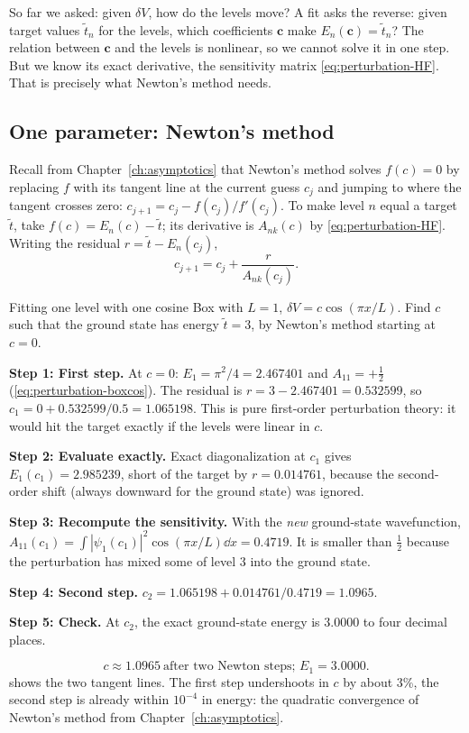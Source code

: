 So far we asked: given $\delta V$, how do the levels move? A fit asks the reverse: given target values $\tilde t_n$ for the levels, which coefficients $\bm c$ make $E_n(\bm c)=\tilde t_n$? The relation between $\bm c$ and the levels is nonlinear, so we cannot solve it in one step. But we know its exact derivative, the sensitivity matrix \cref{eq:perturbation-HF}. That is precisely what Newton's method needs.

\subsection{One parameter: Newton's method}

Recall from Chapter~\ref{ch:asymptotics} that Newton's method solves $f(c)=0$ by replacing $f$ with its tangent line at the current guess $c_j$ and jumping to where the tangent crosses zero: $c_{j+1}=c_j-f(c_j)/f'(c_j)$. To make level $n$ equal a target $\tilde t$, take $f(c)=E_n(c)-\tilde t$; its derivative is $A_{nk}(c)$ by \cref{eq:perturbation-HF}. Writing the residual $r=\tilde t-E_n(c_j)$,
\begin{equation}
c_{j+1}=c_j+\frac{r}{A_{nk}(c_j)} .
\label{eq:perturbation-newton1}
\end{equation}

\begin{sample}{Fitting one level with one cosine}
Box with $L=1$, $\delta V=c\cos(\pi x/L)$. Find $c$ such that the ground state has energy $\tilde t=3$, by Newton's method starting at $c=0$.

\textbf{Step 1: First step.} At $c=0$: $E_1=\pi^2/4=2.467401$ and $A_{11}=+\tfrac12$ (\cref{eq:perturbation-boxcos}). The residual is $r=3-2.467401=0.532599$, so $c_1=0+0.532599/0.5=1.065198$. This is pure first-order perturbation theory: it would hit the target exactly if the levels were linear in $c$.

\textbf{Step 2: Evaluate exactly.} Exact diagonalization at $c_1$ gives $E_1(c_1)=2.985239$, short of the target by $r=0.014761$, because the second-order shift (always downward for the ground state) was ignored.

\textbf{Step 3: Recompute the sensitivity.} With the \emph{new} ground-state wavefunction, $A_{11}(c_1)=\int|\psi_1(c_1)|^2\cos(\pi x/L)\dd x=0.4719$. It is smaller than $\tfrac12$ because the perturbation has mixed some of level 3 into the ground state.

\textbf{Step 4: Second step.} $c_2=1.065198+0.014761/0.4719=1.0965$.

\textbf{Step 5: Check.} At $c_2$, the exact ground-state energy is $3.0000$ to four decimal places.

\[
\boxed{c\approx1.0965\ \text{after two Newton steps; }E_1=3.0000.}
\]
 shows the two tangent lines. The first step undershoots in $c$ by about 3\%, the second step is already within $10^{-4}$ in energy: the quadratic convergence of Newton's method from Chapter~\ref{ch:asymptotics}.
\end{sample}

